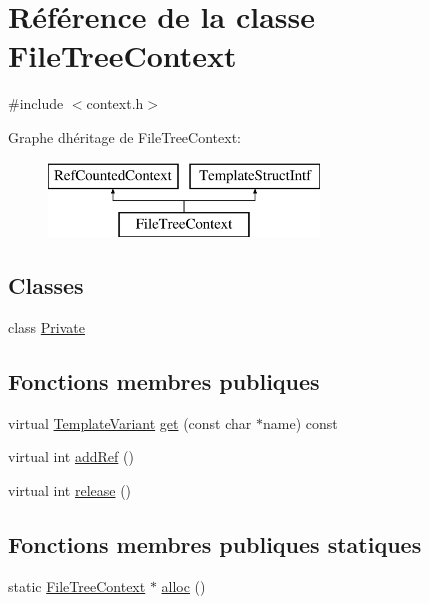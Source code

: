 \hypertarget{class_file_tree_context}{}\section{Référence de la classe File\+Tree\+Context}
\label{class_file_tree_context}


{\ttfamily \#include $<$context.\+h$>$}

Graphe d\textquotesingle{}héritage de File\+Tree\+Context\+:\begin{figure}[H]
\begin{center}
\leavevmode
\includegraphics[height=2.000000cm]{class_file_tree_context}
\end{center}
\end{figure}
\subsection*{Classes}
\begin{DoxyCompactItemize}
\item 
class \hyperlink{class_file_tree_context_1_1_private}{Private}
\end{DoxyCompactItemize}
\subsection*{Fonctions membres publiques}
\begin{DoxyCompactItemize}
\item 
virtual \hyperlink{class_template_variant}{Template\+Variant} \hyperlink{class_file_tree_context_af656b0dccbaef249bc5b4a86ad5372e4}{get} (const char $\ast$name) const 
\item 
virtual int \hyperlink{class_file_tree_context_a01aadccccf538d37ddfea3d4c4149e1f}{add\+Ref} ()
\item 
virtual int \hyperlink{class_file_tree_context_ac5ef9e8a6df42e2ee5c9f7c0fe33545c}{release} ()
\end{DoxyCompactItemize}
\subsection*{Fonctions membres publiques statiques}
\begin{DoxyCompactItemize}
\item 
static \hyperlink{class_file_tree_context}{File\+Tree\+Context} $\ast$ \hyperlink{class_file_tree_context_a63cfb1c931ee4ad78cc6fa745cb1b409}{alloc} ()
\end{DoxyCompactItemize}


